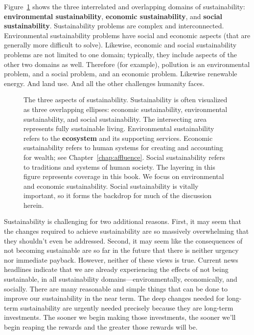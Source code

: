 \documentclass{article}\usepackage[]{graphicx}\usepackage[table]{xcolor}
\begin{document}
Figure~\ref{fig:venn_diagram} shows the three interrelated and overlapping domains
of sustainability:
\textbf{environmental sustainability},
\textbf{economic sustainability}, and
\textbf{social sustainability}.
Sustainability problems are complex and interconnected.
Environmental sustainability problems have social and economic aspects (that are
generally more difficult to solve).
Likewise, economic and social sustainability problems are not limited to one domain;
typically, they include aspects of the other two domains as well.
Therefore (for example), pollution is an environmental problem, and a social problem, and an economic problem.
Likewise renewable energy. And land use. And all the other challenges humanity faces.

\begin{figure}
\centering

  

  \caption[Three aspects of sustainability]
          {The three aspects of sustainability.
           Sustainability is often visualized as three overlapping ellipses:
           economic sustainability,
           environmental sustainability, and
           social sustainability.
           The intersecting area represents fully sustainable living.
           Environmental sustainability
           refers to the \textbf{ecosystem} and its supporting services.
           Economic sustainability
           refers to human systems for creating and accounting for wealth;
           see Chapter~\ref{chap:affluence}.
           Social sustainability
           refers to traditions and systems of human society.
           The layering in this figure represents coverage in this book.
           We focus on environmental and
           economic sustainability.
           Social sustainability is vitally important, so it forms the backdrop
           for much of the discussion herein.}
\label{fig:venn_diagram}
\end{figure}


Sustainability is challenging for two additional reasons.
First, it may seem that the changes required to achieve sustainability are so
massively overwhelming that they shouldn't even be addressed.
Second, it may seem like the consequences of not becoming sustainable are so far
in the future that there is neither urgency nor immediate payback.
However, neither of these views is true.
Current news headlines indicate that we are already
experiencing the effects of not being sustainable, in all
sustainability domains---environmentally, economically, and socially.
There are many reasonable and simple things that can be done to improve our
sustainability in the near term.
The deep changes needed for long-term sustainability are urgently needed precisely because
they are long-term investments.
The sooner we begin making those investments, the sooner we'll begin reaping the
rewards and the greater those rewards will be.
\end{document}
